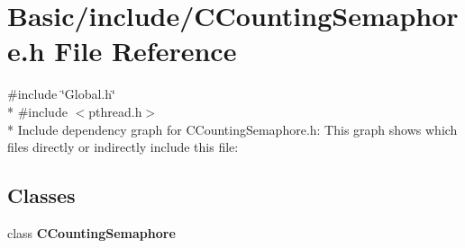 \section{Basic/include/\-C\-Counting\-Semaphore.h File Reference}
\label{CCountingSemaphore_8h}
{\ttfamily \#include \char`\"{}Global.\-h\char`\"{}}\\*
{\ttfamily \#include $<$pthread.\-h$>$}\\*
Include dependency graph for C\-Counting\-Semaphore.\-h\-:
This graph shows which files directly or indirectly include this file\-:
\subsection*{Classes}
\begin{DoxyCompactItemize}
\item 
class {\bf C\-Counting\-Semaphore}
\end{DoxyCompactItemize}
